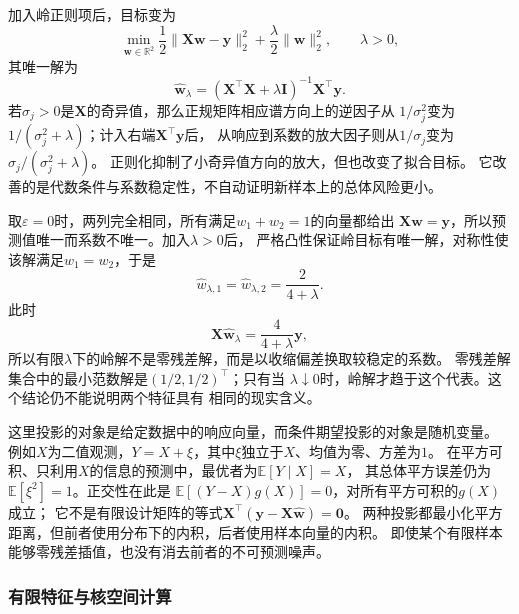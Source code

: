 加入岭正则项后，目标变为
\[
  \min_{\bm{w}\in\mathbb{R}^{2}}
  \frac{1}{2}\lVert\bm{X}\bm{w}-\bm{y}\rVert_2^2
  +
  \frac{\lambda}{2}\lVert\bm{w}\rVert_2^2,
  \qquad \lambda>0,
\]
其唯一解为
\begin{equation}
  \widehat{\bm{w}}_\lambda
  =
  \left(
    \bm{X}^{\top}\bm{X}+\lambda\bm{I}
  \right)^{-1}
  \bm{X}^{\top}\bm{y}.
  \label{eq:future-ridge-solution}
\end{equation}
若$\sigma_j>0$是$\bm{X}$的奇异值，那么正规矩阵相应谱方向上的逆因子从
$1/\sigma_j^2$变为$1/(\sigma_j^2+\lambda)$；计入右端$\bm X^\top\bm y$后，
从响应到系数的放大因子则从$1/\sigma_j$变为$\sigma_j/(\sigma_j^2+\lambda)$。
正则化抑制了小奇异值方向的放大，但也改变了拟合目标。
它改善的是代数条件与系数稳定性，不自动证明新样本上的总体风险更小。

\begin{example}[共线特征的可辨方向]
  \label{ex:future-collinear-ridge}
  取$\varepsilon=0$时，两列完全相同，所有满足$w_1+w_2=1$的向量都给出
  $\bm{X}\bm{w}=\bm{y}$，所以预测值唯一而系数不唯一。加入$\lambda>0$后，
  严格凸性保证岭目标有唯一解，对称性使该解满足$w_1=w_2$，于是
  \[
    \widehat w_{\lambda,1}
    =
    \widehat w_{\lambda,2}
    =
    \frac{2}{4+\lambda}.
  \]
  此时
  \[
    \bm X\widehat{\bm w}_{\lambda}
    =
    \frac{4}{4+\lambda}\bm y,
  \]
  所以有限$\lambda$下的岭解不是零残差解，而是以收缩偏差换取较稳定的系数。
  零残差解集合中的最小范数解是$(1/2,1/2)^{\top}$；只有当
  $\lambda\downarrow0$时，岭解才趋于这个代表。这个结论仍不能说明两个特征具有
  相同的现实含义。
\end{example}

这里投影的对象是给定数据中的响应向量，而条件期望投影的对象是随机变量。
例如$X$为二值观测，$Y=X+\xi$，其中$\xi$独立于$X$、均值为零、方差为$1$。
在平方可积、只利用$X$的信息的预测中，最优者为$\mathbb E[Y\mid X]=X$，
其总体平方误差仍为$\mathbb E[\xi^2]=1$。正交性在此是
$\mathbb E[(Y-X)g(X)]=0$，对所有平方可积的$g(X)$成立；
它不是有限设计矩阵的等式$\bm X^\top(\bm y-\bm X\widehat{\bm w})=\bm0$。
两种投影都最小化平方距离，但前者使用分布下的内积，后者使用样本向量的内积。
即使某个有限样本能够零残差插值，也没有消去前者的不可预测噪声。

\subsubsection{有限特征与核空间计算}
\label{sec:future-finite-features-kernel-space}

